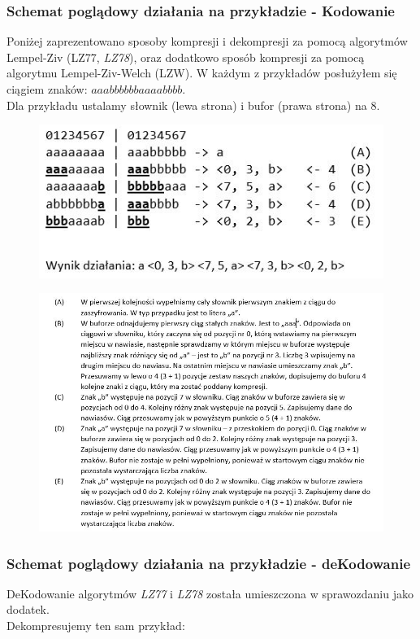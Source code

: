 \documentclass{article}
\begin{document}
\subsubsection{Schemat poglądowy działania na przykładzie - Kodowanie}
Poniżej zaprezentowano sposoby kompresji i dekompresji za pomocą algorytmów Lempel-Ziv (LZ77, \textit{LZ78}), oraz dodatkowo sposób kompresji za pomocą algorytmu Lempel-Ziv-Welch (LZW).
W każdym z przykładów posłużyłem się ciągiem znaków: $aaabbbbbbaaaabbbb$.\\ Dla przykładu ustalamy słownik (lewa strona) i bufor (prawa strona) na 8.
\begin{figure}[h!]
\centering
\includegraphics{img/lz77_1.JPG}
\end{figure}

\newpage

\begin{figure}[h!]
\centering
\includegraphics{img/lz77_2.JPG}
\end{figure}

\subsubsection{Schemat poglądowy działania na przykładzie - deKodowanie}
DeKodowanie algorytmów \textit{LZ77} i \textit{LZ78} została umieszczona w sprawozdaniu jako dodatek.\\Dekompresujemy ten sam przykład:
\end{document}
